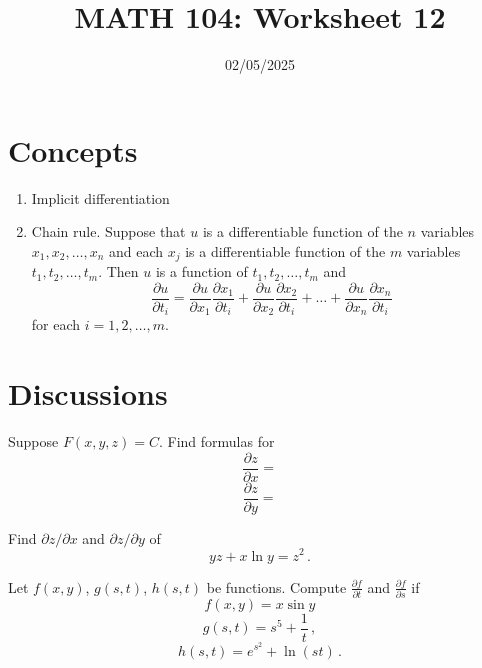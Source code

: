 \documentclass[12pt]{amsart}
\title{ MATH 104: Worksheet 12}
\author{}
\date{02/05/2025}
\begin{document}
\maketitle


\section{Concepts}

\begin{enumerate}
	\item Implicit differentiation
	\item Chain rule.
	      Suppose that $u$ is a differentiable function of the $n$ variables $x_1, x_2, \dots, x_n$ and each $x_j$ is a differentiable function of the $m$ variables $t_1, t_2, \dots, t_m$. Then $u$ is a function of $t_1, t_2, \dots, t_m$ and
	      \[
		      \frac{\partial u}{\partial t_i} = \frac{\partial u}{\partial x_1} \frac{\partial x_1}{\partial t_i} + \frac{\partial u}{\partial x_2} \frac{\partial x_2}{\partial t_i} + \dots + \frac{\partial u}{\partial x_n} \frac{\partial x_n}{\partial t_i}
	      \]
	      for each $i = 1, 2, \dots, m$.
\end{enumerate}

\section{Discussions}

\begin{question}
	Suppose $F(x,y,z) = C$.
	Find formulas for
	\begin{equation*}
		\frac{\partial z}{\partial x} =
	\end{equation*}
	\vspace{3cm}
	\begin{equation*}
		\frac{\partial z}{\partial y} =
	\end{equation*}
	\vspace{3cm}
\end{question}

\newpage
\begin{question}
	Find $\partial z / \partial x$ and $\partial z/ \partial y$ of
	\begin{equation*}
		yz + x \ln y = z^2 \,.
	\end{equation*}
\end{question}

\vspace{7cm}

\begin{question}
	Let $f(x,y)$, $g(s,t)$, $h(s,t)$ be functions.
	Compute $\frac{\partial f}{\partial t}$ and $\frac{\partial f}{\partial s}$ if
	\begin{equation*}
		f(x,y) = x\sin y
	\end{equation*}
	\begin{equation*}
		g(s,t) = s^5 + \frac{1}{t} \,,
	\end{equation*}
	\begin{equation*}
		h(s,t) = e^{s^2} + \ln (st) \,.
	\end{equation*}
\end{question}
\vspace{7cm}
\end{document}
